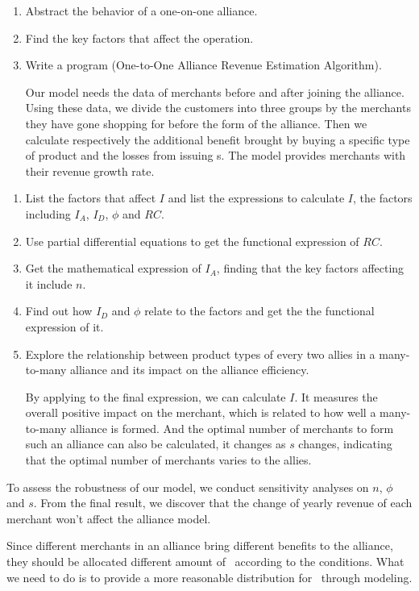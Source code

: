 \begin{enumerate}
		
	\begin{enumerate}[label=(\alph*)]
	\item Abstract the behavior of a one-on-one alliance.
	\item Find the key factors that affect the operation.
	\item Write a program (One-to-One Alliance Revenue Estimation Algorithm).
	
	Our model needs the data of merchants before and after joining the alliance. Using these data, we divide the customers into three groups by the merchants they have gone shopping for before the form of the alliance. Then we calculate respectively the additional benefit brought by buying a specific type of product and the losses from issuing \RPd s. The model provides merchants with their revenue growth rate.
	\end{enumerate}


	\begin{enumerate}[label=(\alph*)]
	\item List the factors that affect $I$ and list the expressions to calculate $I$, the factors including $I_A$, $I_D$, $\phi$ and $RC$.
	\item Use partial differential equations to get the functional expression of $RC$.
	\item Get the mathematical expression of $I_A$, finding that the key factors affecting it include $n$.
	\item Find out how $I_D$ and $\phi$ relate to the factors and get the the functional expression of it.
	\item Explore the relationship between product types of every two allies in a many-to-many alliance and its impact on the alliance efficiency.

	By applying to the final expression, we can calculate $I$. It measures the overall positive impact on the merchant, which is related to how well a many-to-many alliance is formed. And the optimal number of merchants to form such an alliance can also be calculated, it changes as $s$ changes, indicating that the optimal number of merchants varies to the allies.
	\end{enumerate}

		
	To assess the robustness of our model, we conduct sensitivity analyses on $n$, $\phi$ and $s$. From the final result, we discover that the change of yearly revenue of each merchant won't affect the alliance model.

	Since different merchants in an alliance bring different benefits to the alliance, they should be allocated different amount of \RPd\ according to the conditions. What we need to do is to provide a more reasonable distribution for \RPd\ through modeling.

\end{enumerate}